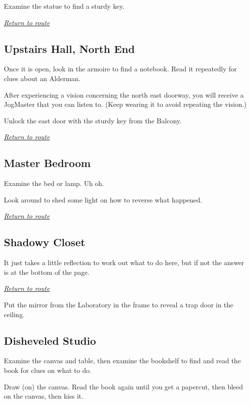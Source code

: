 \documentclass[a5paper]{extarticle}
\begin{document}
Examine the statue to find a sturdy key.

\hyperref[sec:route-9]{\emph{Return to route}}

\newpage
\subsection{Upstairs Hall, North End}\label{sec:sol-Upstairs-Hall-N}

Once it is open, look in the armoire to find a notebook.
Read it repeatedly for clues about an Alderman.

After experiencing a vision concerning the north east doorway,
you will receive a JogMaster that you can listen to.
(Keep wearing it to avoid repeating the vision.)

Unlock the east door with the sturdy key from the Balcony.

\hyperref[sec:route-9]{\emph{Return to route}}

\newpage
\subsection{Master Bedroom}\label{sec:sol-Master-Bedroom}

Examine the bed or lamp. Uh oh.

Look around to shed some light on how to reverse what happened.

\hyperref[sec:route-9]{\emph{Return to route}}

\newpage
\subsection{Shadowy Closet}\label{sec:sol-Shadowy-Closet}

It just takes a little reflection to work out what to do here, but if not the
answer is at the bottom of the page.

\hyperref[sec:route-9]{\emph{Return to route}}

\vfill
Put the mirror from the Laboratory in the frame
to reveal a trap door in the ceiling.

\newpage
\subsection{Disheveled Studio}\label{sec:sol-Disheveled-Studio}

Examine the canvas and table,
then examine the bookshelf to find and read the book for clues on what to do.

Draw (on) the canvas.
Read the book again until you get a papercut, then bleed on the canvas, then kiss it.
\end{document}
